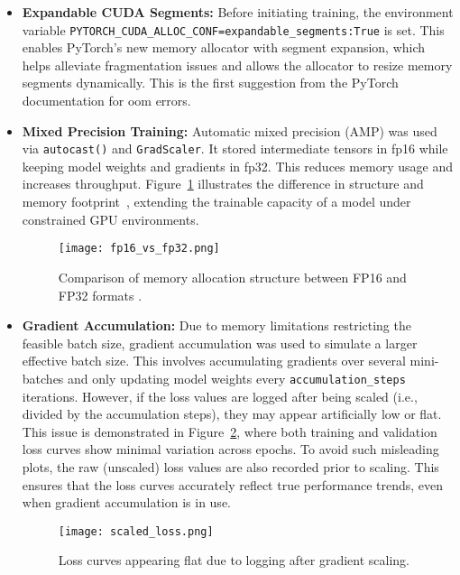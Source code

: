 \begin{itemize}
    \item \textbf{Expandable CUDA Segments:} Before initiating training, the environment variable \texttt{PYTORCH\_CUDA\_ALLOC\_CONF=expandable\_segments:True} is set. This enables PyTorch’s new memory allocator with segment expansion, which helps alleviate fragmentation issues and allows the allocator to resize memory segments dynamically. This is the first suggestion from the PyTorch documentation for \gls{oom} errors.

    \item \textbf{Mixed Precision Training:} Automatic mixed precision (AMP) was used via \texttt{autocast()} and \texttt{GradScaler}. It stored intermediate tensors in \gls{fp16} while keeping model weights and gradients in \gls{fp32}. This reduces memory usage and increases throughput. Figure~\ref{fig:fp16_vs_fp32} illustrates the difference in structure and memory footprint~\cite{mindspore_mixed_precision}, extending the trainable capacity of a model under constrained GPU environments.

    \begin{figure}[H]
        \centering
        \texttt{[image: fp16\_vs\_fp32.png]}
        \caption{Comparison of memory allocation structure between FP16 and FP32 formats \cite{mindspore_mixed_precision}.}
        \label{fig:fp16_vs_fp32}
    \end{figure}

    \item \textbf{Gradient Accumulation:} Due to memory limitations restricting the feasible batch size, gradient accumulation was used to simulate a larger effective batch size. This involves accumulating gradients over several mini-batches and only updating model weights every \texttt{accumulation\_steps} iterations. However, if the loss values are logged after being scaled (i.e., divided by the accumulation steps), they may appear artificially low or flat. This issue is demonstrated in Figure~\ref{fig:scaled_loss}, where both training and validation loss curves show minimal variation across epochs. To avoid such misleading plots, the raw (unscaled) loss values are also recorded prior to scaling. This ensures that the loss curves accurately reflect true performance trends, even when gradient accumulation is in use.

    \begin{figure}[H]
        \centering
        \texttt{[image: scaled\_loss.png]}
        \caption{Loss curves appearing flat due to logging after gradient scaling.}
        \label{fig:scaled_loss}
    \end{figure}


\end{itemize}
